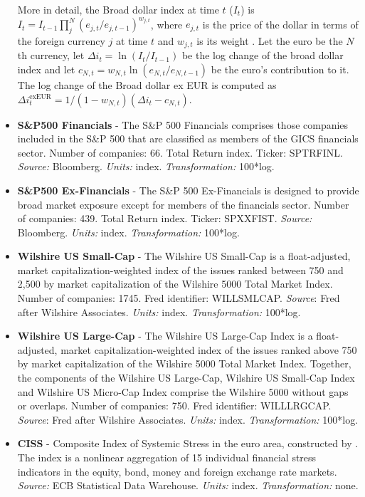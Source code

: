 \documentclass[a4paper,12pt]{article}
\begin{document}
\begin{itemize}
More in detail, the Broad dollar index at time $t$ ($I_t$) is $I_t = I_{t-1} \prod_j^N (e_{j,t}/e_{j,t-1})^{w_{j,t}}$, where $e_{j,t}$ is the price of the dollar in terms of the foreign currency $j$ at time $t$ and $w_{j,t}$ is its weight \citep{Beschwitz_etal_2019}. Let the euro be the $N$th currency, let $\Delta i_t = \ln(I_t/I_{t-1})$ be the log change of the broad dollar index and let $c_{N,t} = w_{N,t}\ln (e_{N,t}/e_{N,t-1})$ be the euro's contribution to it. The log change of the Broad dollar ex EUR is computed as $\Delta i_t^\text{exEUR} = 1/(1-w_{N,t}) (\Delta i_t - c_{N,t})$.
\item
\textbf{S\&P500 Financials} - The S\&P 500 Financials comprises those companies included in the S\&P 500 that are classified as members of the GICS financials sector. Number of companies: 66. Total Return index. Ticker: SPTRFINL.
\emph{Source:} Bloomberg. \emph{Units:} index. \emph{Transformation:} 100*log.
\item
\textbf{S\&P500 Ex-Financials} - The S\&P 500 Ex-Financials is designed to provide broad market exposure except for members of the financials sector.
Number of companies: 439. Total Return index. Ticker: SPXXFIST.
\emph{Source:} Bloomberg. \emph{Units:} index. \emph{Transformation:} 100*log.
\item
\textbf{Wilshire US Small-Cap} - The Wilshire US Small-Cap is a float-adjusted, market capitalization-weighted index of the issues ranked between 750 and 2,500 by market capitalization of the Wilshire 5000 Total Market Index.
 Number of companies: 1745. Fred identifier: WILLSMLCAP.  \emph{Source}: Fred after Wilshire Associates. \emph{Units:} index. \emph{Transformation:} 100*log.
\item
\textbf{Wilshire US Large-Cap} - The Wilshire US Large-Cap Index is a float-adjusted, market capitalization-weighted index of the issues ranked above 750 by market capitalization of the Wilshire 5000 Total Market Index. Together, the components of the Wilshire US Large-Cap, Wilshire US Small-Cap Index and Wilshire US Micro-Cap Index comprise the Wilshire 5000 without gaps or overlaps. Number of companies: 750. Fred identifier: WILLLRGCAP. \emph{Source}: Fred after Wilshire Associates. \emph{Units:} index. \emph{Transformation:} 100*log.
\item
\textbf{CISS} - Composite Index of Systemic Stress in the euro area, constructed by \cite{Hollo_Kremer_LoDuca_2012}. The index is a nonlinear aggregation of 15 individual financial
stress indicators in the equity, bond, money and foreign exchange rate markets. \emph{Source:} ECB Statistical Data Warehouse. \emph{Units:} index. \emph{Transformation:} none.

\end{itemize}
\end{document}
